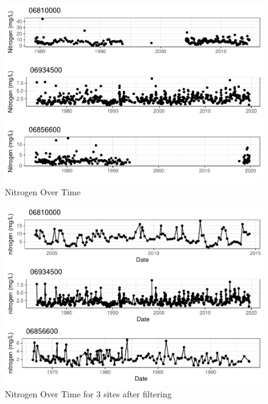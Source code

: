 \documentclass[12pt,]{article}
\begin{document}
\begin{figure}
\centering
\includegraphics{Project_Template_files/figure-latex/N.t-1.pdf}
\caption{\label{fig:N.t}Nitrogen Over Time}
\end{figure}

\begin{figure}
\centering
\includegraphics{Project_Template_files/figure-latex/N.t3-1.pdf}
\caption{\label{fig:N.t3}Nitrogen Over Time for 3 sites after filtering}
\end{figure}
\end{document}
